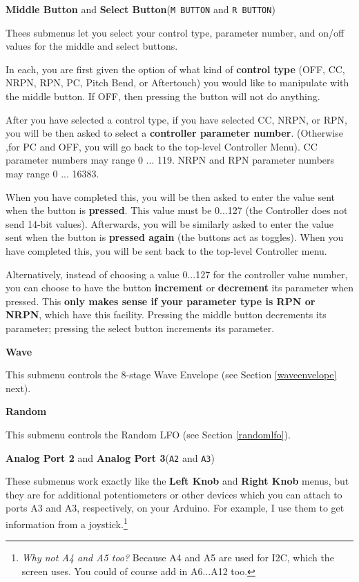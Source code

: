 \documentclass{article}
\begin{document}
\begin{description}
	\item{\bf Middle Button} and {\bf Select Button}\quad (\texttt{M BUTTON} and \texttt{R BUTTON})
	
	Thees submenus let you select your control type, parameter number, and on/off values for the middle and select buttons.
	
	In each, you are first given the option of what kind of {\bf control type} (OFF, CC, NRPN, RPN, PC, Pitch Bend, or Aftertouch)%
you would like to manipulate with the middle button.  If OFF, then pressing the button will not do anything.

	After you have selected a control type, if you have selected CC, NRPN, or RPN, you will be then asked to select a {\bf controller parameter number}.  (Otherwise ,for PC and OFF, you will go back to the top-level Controller Menu).  CC parameter numbers may range 0 ... 119.  NRPN and RPN parameter numbers may range 0 ... 16383.
	
	When you have completed this, you will be then asked to enter the value sent when the button is {\bf pressed}.  This value must be 0...127 (the Controller does not send 14-bit values).  Afterwards, you will be similarly asked to enter the value sent when the button is {\bf pressed again} (the buttons act as toggles).  When you have completed this, you will be sent back to the top-level Controller menu.
	
	Alternatively, instead of choosing a value 0...127 for the controller value number, you can choose to have the button {\bf increment} or {\bf decrement} its parameter when pressed.  This {\bf only makes sense if your parameter type is RPN or NRPN}, which have this facility.  Pressing the middle button decrements its parameter; pressing the select button increments its parameter.   
	
	\item{\bf Wave}
	
	This submenu controls the 8-stage Wave Envelope (see Section \ref{waveenvelope} next).

	\item{\bf Random}
	
	This submenu controls the Random LFO (see Section \ref{randomlfo}).

	\item{\bf Analog Port 2} and {\bf Analog Port 3}\quad (\texttt{A2} and \texttt{A3})
	
	These submenus work exactly like the {\bf Left Knob} and {\bf Right Knob} menus, but they are for additional potentiometers or other devices which you can attach to ports A3 and A3, respectively, on your Arduino.  For example, I use them to get information from a joystick.\footnote{{\it Why not A4 and A5 too?\quad} Because A4 and A5 are used for I2C, which the screen uses.  You could of course add in A6...A12 too.}
	
	\end{description}
	
\end{document}
